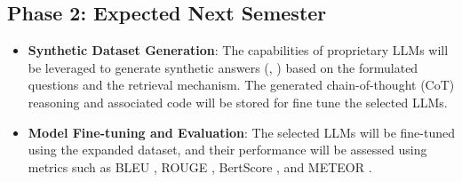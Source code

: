 \subsection{Phase 2: Expected Next Semester}

\begin{itemize}
    \item \textbf{Synthetic Dataset Generation}: The capabilities of proprietary LLMs will be leveraged to generate synthetic answers (\cite{Nvidia2024KaggleMath}, \cite{Liu2024NLDriven}) based on the formulated questions and the retrieval mechanism. The generated chain-of-thought (CoT) reasoning and associated code will be stored for fine tune the selected LLMs.
    \item \textbf{Model Fine-tuning and Evaluation}: The selected LLMs will be fine-tuned using the expanded dataset, and their performance will be assessed using metrics such as BLEU \cite{bleuPaper}, ROUGE \cite{rougePaper}, BertScore \cite{bertscorePaper}, and METEOR \cite{meteorPaper}.
\end{itemize}






